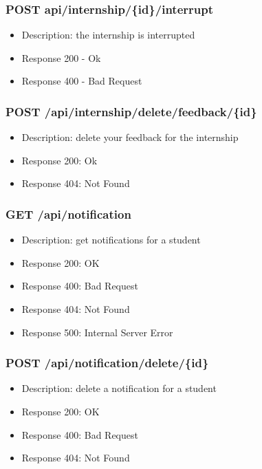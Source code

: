 \subsubsection{POST api/internship/\{id\}/interrupt}
\begin{itemize}
    \item Description: the internship is interrupted
    \item Response 200 - Ok
    \item Response 400 - Bad Request
\end{itemize}

\subsubsection{POST /api/internship/delete/feedback/\{id\}}
\begin{itemize}
    \item Description: delete your feedback for the internship
    \item Response 200: Ok
    \item Response 404: Not Found
\end{itemize}

\subsubsection{GET /api/notification}
\begin{itemize}
    \item Description: get notifications for a student
    \item Response 200: OK
    \item Response 400: Bad Request
    \item Response 404: Not Found
    \item Response 500: Internal Server Error
\end{itemize}

\subsubsection{POST /api/notification/delete/\{id\}}
\begin{itemize}
    \item Description: delete a notification for a student
    \item Response 200: OK
    \item Response 400: Bad Request
    \item Response 404: Not Found
\end{itemize}

